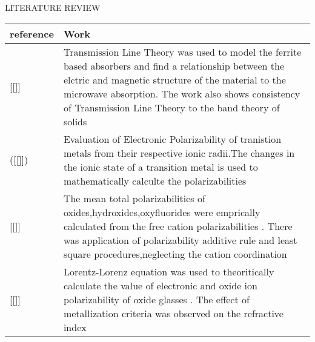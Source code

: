\documentclass[11pt,aspect ratio=169]{beamer}
\let\oldbib\bibentry
\renewcommand{\bibentry}[1]{{\tiny[\oldbib{#1}]}}
\begin{document}
\begin{frame}{LITERATURE REVIEW}
	
	\begin{tabular}{p{}p{}}
		
		\toprule
		reference & Work \\
		\midrule
		\bibentry{r12} &\small Transmission Line Theory was used to model the ferrite based absorbers and find a relationship between the elctric and magnetic structure of the material to the microwave absorption. The work also shows consistency of Transmission Line Theory to the band theory of solids\\
		(\bibentry{r20}) & \small Evaluation of  Electronic Polarizability of tranistion metals from their respective ionic radii.The changes in the ionic state of a transition metal is used to mathematically calculte the polarizabilities\\
		\bibentry{r8} & \small The mean total polarizabilities of oxides,hydroxides,oxyfluorides were emprically calculated from the free cation polarizabilities . There was application of polarizability additive rule and least square procedures,neglecting the cation coordination\\
		\bibentry{r9} & \small Lorentz-Lorenz equation was used to theoritically calculate the value of electronic and oxide ion polarizability of oxide glasses . The effect of metallization criteria was observed on the refractive index\\
		\bottomrule
		
	\end{tabular}
\end{frame}
\end{document}
